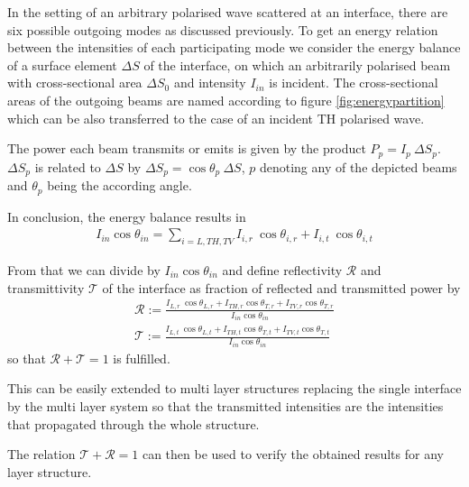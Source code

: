In the setting of an arbitrary polarised wave scattered at an interface,
there are six possible outgoing modes as discussed previously.
To get an energy relation between the intensities of each
participating mode we consider the energy balance of a surface element
$\Delta S$ of the interface, on which an arbitrarily polarised beam with
cross-sectional
area $\Delta S_{0}$ and intensity $I_{in}$ is incident. The cross-sectional
areas of the outgoing beams are named according to figure
\ref{fig:energypartition} which can be also transferred to the case of an
incident TH polarised wave.

The power each beam transmits or emits is given by the product $P_p = I_p\
    \Delta S_p$. $\Delta S_p$ is related to $\Delta S$ by $\Delta S_p =
    \cos\theta_p\ \Delta S$,
$p$ denoting any of the depicted beams and $\theta_p$ being the according
angle.

In conclusion, the energy balance results in
\begin{align}
    I_{in} \cos\theta_{in} = \sum\limits_{i=L,TH,TV} I_{i,r}\  \cos\theta_{i,r}
    + I_{i,t}\	\cos\theta_{i,t}
\end{align}

From that we can divide by $I_{in}\cos \theta_{in}$ and define reflectivity
$\mathcal{R}$ and transmittivity $\mathcal{T}$ of the
interface as fraction of reflected and transmitted power by
\begin{align}
    \mathcal{R} := \frac{ I_{L,r}\  \cos\theta_{L,r} + I_{TH,r}
        \cos\theta_{T,r} +
    I_{TV,r}  \cos\theta_{T,r}}{I_{in} \cos\theta_{in}} \\
    \mathcal{T} := \frac{ I_{L,t}\  \cos\theta_{L,t} + I_{TH,t}
        \cos\theta_{T,t} +
        I_{TV,t}  \cos\theta_{T,t}}{I_{in} \cos\theta_{in}}
\end{align}
so that $\mathcal{R} + \mathcal{T} = 1$ is fulfilled.

This can be easily extended to multi layer structures replacing the single
interface by the multi layer system so that the transmitted intensities are the
intensities that propagated through the whole structure.

The relation $\mathcal{T}+\mathcal{R}=1$ can then be used to verify the
obtained results for any layer structure.

